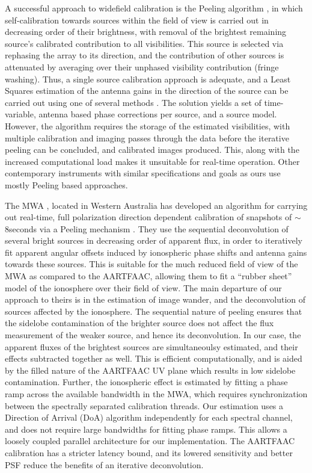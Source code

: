 \documentclass{aa}
\begin{document}
A  successful  approach  to  widefield  calibration  is  the  Peeling  algorithm
\citep{noordam2004peel,vdTol2007selfcallofar}, in which self-calibration towards
sources within  the field of  view is carried  out in decreasing order  of their
brightness,  with  removal  of   the  brightest  remaining  source's  calibrated
contribution  to all  visibilities. This  source is  selected via  rephasing the
array to its  direction, and the contribution of other  sources is attenuated by
averaging over their unphased  visibility contribution (fringe washing). Thus, a
single source calibration  approach is adequate, and a  Least Squares estimation
of the antenna gains in the direction of the source can be carried out using one
of  several methods  \citep{boonstra2003gain}.   The solution  yields  a set  of
time-variable, antenna based  phase corrections per source, and  a source model.
However, the algorithm requires the  storage of the estimated visibilities, with
multiple calibration  and imaging passes  through the data before  the iterative
peeling can be  concluded, and calibrated images produced.  This, along with the
increased computational load makes it unsuitable for real-time operation.  Other
contemporary  instruments with  similar  specifications and  goals  as ours  use
mostly Peeling  based approaches. 

The  MWA   \citep{lonsdale2009murchison},  located  in   Western  Australia  has
developed an  algorithm for carrying out real-time,  full polarization direction
dependent  calibration of snapshots  of $\sim$8seconds  via a  Peeling mechanism
\citep{mitchell2008real}.   They  use the  sequential  deconvolution of  several
bright sources in decreasing order of apparent flux, in order to iteratively fit
apparent angular offsets  induced by ionospheric phase shifts  and antenna gains
towards these  sources. This is suitable for  the much reduced field  of view of
the MWA  as compared to  the AARTFAAC, allowing  them to fit a  ``rubber sheet''
model of  the ionosphere over  their field of  view.  The main departure  of our
approach to theirs  is in the estimation of image  wander, and the deconvolution
of sources affected by the ionosphere.  The sequential nature of peeling ensures
that the sidelobe contamination of the  brighter source does not affect the flux
measurement of the weaker source, and hence its deconvolution.  In our case, the
apparent fluxes of the brightest sources are simultaneoulsy estimated, and their
effects subtracted together as well.   This is efficient computationally, and is
aided  by the  filled  nature of  the AARTFAAC  UV  plane which  results in  low
sidelobe contamination. Further, the  ionospheric effect is estimated by fitting
a  phase  ramp  across  the  available  bandwidth in  the  MWA,  which  requires
synchronization  between  the  spectrally  separated calibration  threads.   Our
estimation uses  a Direction of  Arrival (DoA) algorithm independently  for each
spectral channel, and does not require large bandwidths for fitting phase ramps.
This allows a loosely coupled parallel architecture for our implementation.  The
AARTFAAC calibration has  a stricter latency bound, and  its lowered sensitivity
and better PSF reduce the benefits of  an iterative deconvolution.
\end{document}
